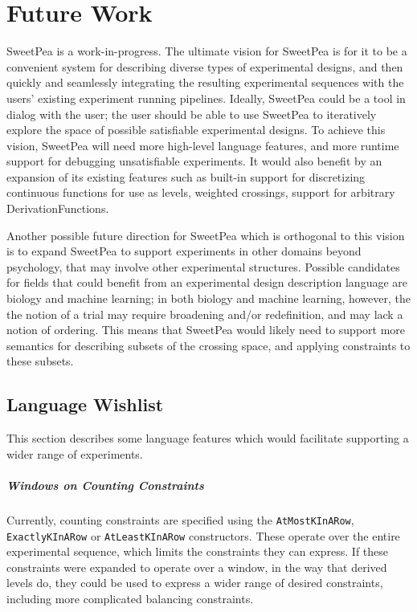 \chapter{Future Work}

SweetPea is a work-in-progress. The ultimate vision for SweetPea is for it to be a convenient system for describing diverse types of experimental designs, and then quickly and seamlessly integrating the resulting experimental sequences with the users' existing experiment running pipelines. Ideally, SweetPea could be a tool in dialog with the user; the user should be able to use SweetPea to iteratively explore the space of possible satisfiable experimental designs. To achieve this vision, SweetPea will need more high-level language features, and more runtime support for debugging unsatisfiable experiments. It would also benefit by an expansion of its existing features such as built-in support for discretizing continuous functions for use as levels, weighted crossings, support for arbitrary DerivationFunctions.

Another possible future direction for SweetPea which is orthogonal to this vision is to expand SweetPea to support experiments in other domains beyond psychology, that may involve other experimental structures. Possible candidates for fields that could benefit from an experimental design description language are biology and machine learning; in both biology and machine learning, however, the the notion of a trial may require broadening and/or redefinition, and may lack a notion of ordering. This means that SweetPea would likely need to support more semantics for describing subsets of the crossing space, and applying constraints to these subsets.

\section{Language Wishlist}

This section describes some language features which would facilitate supporting a wider range of experiments.

\paragraph*{Windows on Counting Constraints}
Currently, counting constraints are specified using the \texttt{AtMostKInARow}, \texttt{ExactlyKInARow} or \texttt{AtLeastKInARow} constructors. These operate over the entire experimental sequence, which limits the constraints they can express. If these constraints were expanded to operate over a window, in the way that derived levels do, they could be used to express a wider range of desired constraints, including more complicated balancing constraints.

